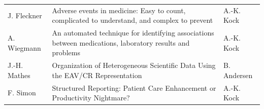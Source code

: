 \documentclass[
12pt,
headsepline,
bibliography=totoc,
twoside=semi,
fleqn
]{scrartcl}
\begin{document}
\begin{table}[t]
\begin{tabular}{p{2.5cm}p{8.7cm}p{2.8cm}}
        J. Fleckner & Adverse events in medicine: Easy to count, complicated to understand, and
        complex to prevent & A.-K. Kock \\
        A. Wiegmann & An automated technique for identifying associations between medications,
        laboratory results and problems & A.-K. Kock \\
        J.-H. Mathes & Organization of Heterogeneous Scientific Data Using the EAV/CR
        Representation & B. Andersen\\
        F. Simon & Structured Reporting: Patient Care Enhancement or Productivity Nightmare? & A.-K. Kock\\
        \bottomrule
    \end{tabular}
    \vspace{2ex}
\end{table}


\newpage
%

\footnotesize
\end{document}
